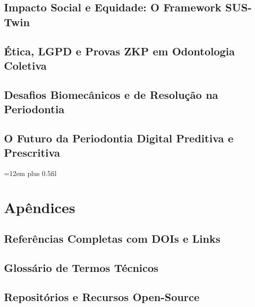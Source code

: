 \documentclass[12pt,a4paper,oneside,openright]{abntex2}
\theoremstyle{definition}
\begin{document}
\chapter{Impacto Social e Equidade: O Framework SUS-Twin} \label{ch:impacto}

\chapter{Ética, LGPD e Provas ZKP em Odontologia Coletiva} \label{ch:etica}

\chapter{Desafios Biomecânicos e de Resolução na Periodontia} \label{ch:desafios}

\chapter{O Futuro da Periodontia Digital Preditiva e Prescritiva} \label{ch:futuro}


\postextual

\emergencystretch=12em
\rightskip=0pt plus 0.5fil



\part*{Apêndices}

\chapter{Referências Completas com DOIs e Links}

\chapter{Glossário de Termos Técnicos}

\chapter{Repositórios e Recursos Open-Source}

\end{document}
